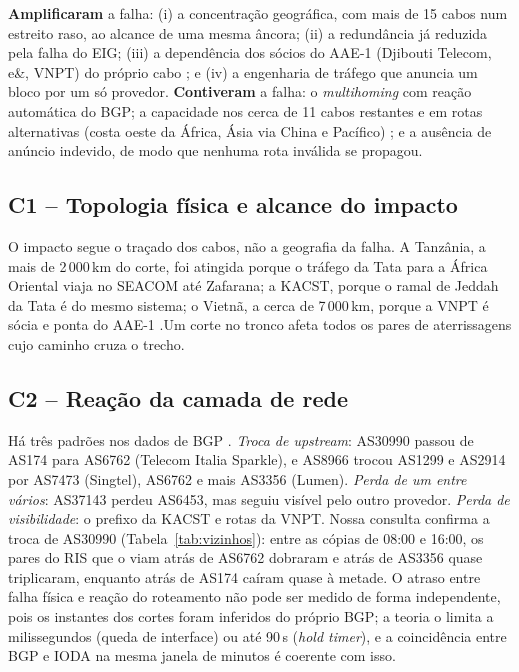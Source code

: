 \documentclass[12pt]{article}
\begin{document}
\textbf{Amplificaram} a falha: (i) a concentração geográfica, com mais de 15 cabos num
estreito raso, ao alcance de uma mesma âncora; (ii) a redundância já reduzida pela falha do
EIG; (iii) a dependência dos sócios do AAE-1 (Djibouti Telecom, e\&, VNPT) do próprio cabo
\cite{telegeography2026}; e (iv) a engenharia de tráfego que anuncia um bloco por um só
provedor. \textbf{Contiveram} a falha: o \textit{multihoming} com reação automática do
BGP; a capacidade nos cerca de 11 cabos restantes e em rotas alternativas (costa oeste da
África, Ásia via China e Pacífico) \cite{hgc2024b,seacom2024a}; e a ausência de anúncio
indevido, de modo que nenhuma rota inválida se propagou.

\subsection{C1 -- Topologia física e alcance do impacto}

O impacto segue o traçado dos cabos, não a geografia da falha. A Tanzânia, a mais de
2\,000\,km do corte, foi atingida porque o tráfego da Tata para a África Oriental viaja no
SEACOM até Zafarana; a KACST, porque o ramal de Jeddah da Tata é do mesmo sistema; o
Vietnã, a cerca de 7\,000\,km, porque a VNPT é sócia e ponta do AAE-1
\cite{telegeography2026,madory2024}.Um corte no tronco afeta todos os pares de aterrissagens cujo caminho cruza o trecho.

\subsection{C2 -- Reação da camada de rede}\label{sec:c2}

Há três padrões nos dados de BGP \cite{madory2024}. \emph{Troca de upstream}: AS30990
passou de AS174 para AS6762 (Telecom Italia Sparkle), e AS8966 trocou AS1299 e AS2914 por
AS7473 (Singtel), AS6762 e mais AS3356 (Lumen). \emph{Perda de um entre vários}: AS37143
perdeu AS6453, mas seguiu visível pelo outro provedor. \emph{Perda de visibilidade}: o
prefixo da KACST e rotas da VNPT. Nossa consulta confirma a troca de AS30990
(Tabela~\ref{tab:vizinhos}): entre as cópias de 08:00 e 16:00, os pares do RIS que o viam
atrás de AS6762 dobraram e atrás de AS3356 quase triplicaram, enquanto atrás de AS174
caíram quase à metade. O atraso entre falha física e reação do roteamento não pode ser medido
de forma independente, pois os instantes dos cortes foram inferidos do próprio BGP; a
teoria o limita a milissegundos (queda de interface) ou até 90\,s (\textit{hold timer}),
e a coincidência entre BGP e IODA na mesma janela de minutos é coerente com isso.
\end{document}
